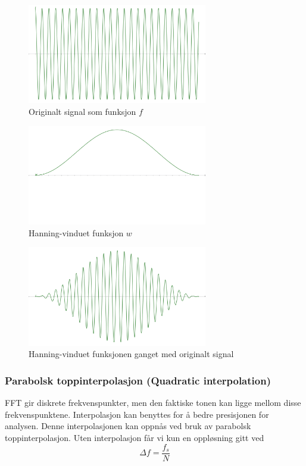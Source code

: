 \begin{figure}[h!]
    \centering
    \includegraphics[width=0.7\textwidth]{./Media/org_signal.png}
    \caption{Originalt signal som funksjon $f$}
    \label{fig:org_signal}
\end{figure}
\begin{figure}[h!]
    \centering
    \includegraphics[width=0.7\textwidth]{./Media/window_func.png}
    \caption{Hanning-vinduet funksjon $w$}
    \label{fig:window_func}
\end{figure}
\begin{figure}[h!]
    \centering
    \includegraphics[width=0.7\textwidth]{./Media/windowd_signal.png}
    \caption{Hanning-vinduet funksjonen ganget med originalt signal}
    \label{fig:windowed_signal}
\end{figure}

\clearpage

\subsubsection{Parabolsk toppinterpolasjon (Quadratic interpolation)}
FFT gir diskrete frekvenspunkter, men den faktiske tonen kan ligge mellom disse frekvenspunktene. Interpolasjon kan benyttes for å bedre presisjonen for analysen. Denne interpolasjonen kan oppnås ved bruk av parabolsk toppinterpolasjon. Uten interpolasjon får vi kun en oppløsning gitt ved
\[
\Delta f = \frac{f_s}{N}
\]

